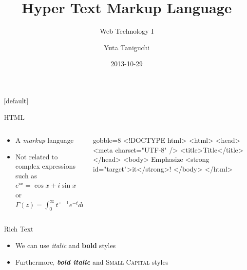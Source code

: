 \documentclass[14pt]{beamer}
\title{Hyper Text Markup Language}
\subtitle{Web Technology I}
\author{Yuta Taniguchi}
\institute{@yuttieyuttie}
\date{2013-10-29}
\begin{document}
{%
  [default]
  \frame{\titlepage}
}
\setcounter{framenumber}{0}


\begin{frame}[fragile]{HTML}
  \begin{columns}
    \begin{column}{0.4\textwidth}
      \begin{itemize}
        \item A \emph{markup} language
        \item Not related to complex expressions such as
          $e^{ix} = \cos x + i \sin x$ or
          $\Gamma(z) = \int_0^\infty t^{z-1} e^{-t} dt$
      \end{itemize}
    \end{column}
    \begin{column}{0.6\textwidth}
      \begin{html*}{gobble=8}
        <!DOCTYPE html>
        <html>
          <head>
            <meta charset="UTF-8" />
            <title>Title</title>
          </head>
          <body>
            Emphasize
            <strong id="target">it</strong>!
          </body>
        </html>
      \end{html*}
    \end{column}
  \end{columns}
\end{frame}


\begin{frame}[fragile]{Rich Text}
  \begin{itemize}
  \item We can use \textit{italic} and \textbf{bold} styles
  \item Furthermore, \textit{\textbf{bold italic}} and \textsc{Small Capital} styles
  \end{itemize}
\end{frame}
\end{document}
